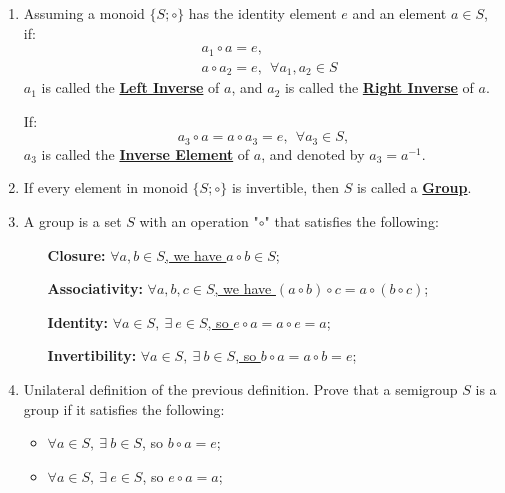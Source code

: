 \documentclass[12pt]{scrartcl}
\begin{document}
{{\begin{enumerate}[label=(\alph*)]
	\item 
	Assuming a monoid $\{S; \circ\}$ has the identity element $e$ and an element $a \in S$, if:
	\begin{align*}
	&a_1 \circ a = e,\\
	&a \circ a_2 = e, ~~\forall a_1, a_2 \in S
	\end{align*}	
	$a_1$ is called the \underline{\textbf{Left Inverse}\vphantom{g}} of $a$, and $a_2$ is called the \underline{\textbf{Right Inverse}} of $a$.

	If:
	$$a_3 \circ a = a \circ a_3 = e, ~~\forall a_3 \in S,$$
	$a_3$ is called the \underline{\textbf{Inverse Element}\vphantom{g}} of $a$, and denoted by $a_3 = a^{-1}.$ \\


	\item If every element in monoid $\{S; \circ\}$ is invertible, then $S$ is called a \underline{\textbf{Group}}. \\

\newpage

	\item A group is a set $S$ with an operation "$\circ$" that satisfies the following:
		
		\begin{itemize}[leftmargin=100pt]
		\item[\textbf{Closure: }] \underline{$\forall a, b \in S$, we have $a \circ b \in S$}; 
		\item[\textbf{Associativity: }] \underline{$\forall a, b, c \in S$, we have $(a \circ b) \circ c = a \circ (b \circ c)$};
		\item[\textbf{Identity: }] \underline{$\forall a \in S, ~ \exists ~ e \in S$, so $e \circ a = a \circ e = a$};
		\item[\textbf{Invertibility: }] \underline{$\forall a \in S, ~ \exists ~ b \in S$, so $b \circ a = a \circ b = e$}; \\
		\end{itemize} 


	\item \begin{spacing}{1.3}Unilateral definition of the previous definition. Prove that a semigroup $S$ is a group if it satisfies the following: 
		
		\begin{itemize}[leftmargin=50pt]
		\item $\forall a \in S, ~ \exists ~ b \in S$, so $b \circ a = e$;
		\item $\forall a \in S, ~ \exists ~ e \in S$, so $e \circ a = a$; \\
		\end{itemize} 
	

\end{spacing}
\end{enumerate}}}
\end{document}
